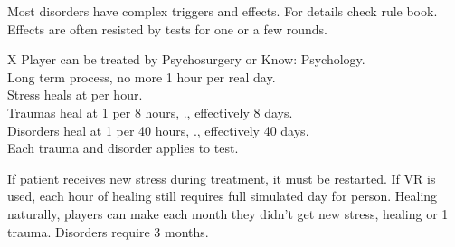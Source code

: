 \begin{itemize}
    \itembox Most disorders have complex triggers and effects. For details check rule book.
    \itembox Effects are often resisted by  tests for one or a few rounds.
\end{itemize}

\bigskip

\begin{eptable}{ X }
   Player can be treated by Psychosurgery or Know: Psychology.\\
   Long term process, no more 1 hour per real day.\\
   Stress heals at  per hour.\\
   Traumas heal at \num{1} per \num{8} hours, \ie., effectively \num{8} days.\\
   Disorders heal at \num{1} per \num{40} hours, \ie., effectively \num{40} days.\\
   Each trauma and disorder applies  to test.\\
\end{eptable}

\begin{itemize}
    \itembox If patient receives new stress during treatment, it must be restarted.
    \itembox If VR is used, each hour of healing still requires full simulated day for person.
    \itembox Healing naturally, players can make  each month they didn't get new
            stress, healing  or \num{1} trauma. Disorders require \num{3} months.
\end{itemize}
